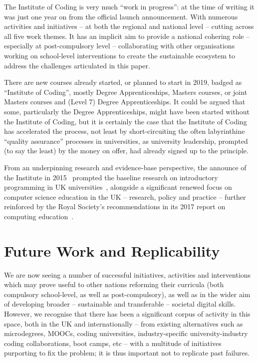 \documentclass[sigconf,anonymous]{acmart}
\begin{document}
The Institute of Coding is very much ``work in progress'': at the time
of writing it was just one year on from the official launch
announcement.  With numerous activities and initiatives -- at both the
regional and national level -- cutting across all five work themes. It
has an implicit aim to provide a national cohering role -- especially
at post-compulsory level -- collaborating with other organisations
working on school-level interventions to create the sustainable
ecosystem to address the challenges articulated in this paper.

There are new courses already started, or planned to start in 2019,
badged as ``Institute of Coding'', mostly Degree Apprenticeships,
Masters courses, or joint Masters courses and (Level 7) Degree
Apprenticeships.  It could be argued that some, particularly the
Degree Apprenticeships, might have been started without the Institute
of Coding, but it is certainly the case that the Institute of Coding
has accelerated the process, not least by short-circuiting the often
labyrinthine ``quality assurance'' processes in universities, as
university leadership, prompted (to say the least) by the money on
offer, had already signed up to the principle.

From an underpinning research and evidence-base perspective, the
announce of the Institute in 2015~\cite{HMG2015a} prompted the
baseline research on introductory programming in UK
universities~\cite{murphy-et-al:programming2017,simon-et-al:sigcse2018},
alongside a significant renewed focus on computer science education in
the UK -- research, policy and practice -- further reinforced by the
Royal Society's recommendations in its 2017 report on computing
education~\cite{rs:2017}.


\section{Future Work and Replicability}\label{concl}

We are now seeing a number of successful initiatives, activities and
interventions which may prove useful to other nations reforming their
curricula (both compulsory school-level, as well as post-compulsory),
as well as in the wider aim of developing broader -- sustainable and
transferable -- societal digital skills. However, we recognise that
there has been a significant corpus of activity in this space, both in
the UK and internationally -- from existing alternatives such as
microdegrees, MOOCs, coding universities, industry-specific
university-industry coding collaborations, boot camps, etc -- with a
multitude of initiatives purporting to fix the problem; it is thus
important not to replicate past failures.
\end{document}
